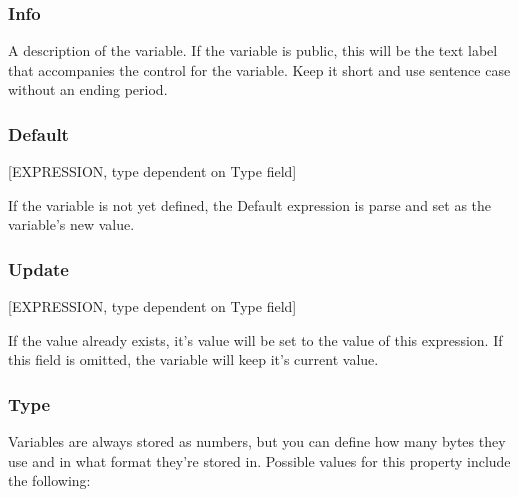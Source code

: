 \documentclass[12pt,a4paper,notitlepage]{article}
\begin{document}
\subsubsection{Info}
A description of the variable. If the variable is public, this will be the text label that accompanies the control for the variable. Keep it short and use sentence case without an ending period.

\subsubsection{Default}
[EXPRESSION, type dependent on Type field]

If the variable is not yet defined, the Default expression is parse and set as the variable's new value.

\subsubsection{Update}
[EXPRESSION, type dependent on Type field]

If the value already exists, it's value will be set to the value of this expression. If this field is omitted, the variable will keep it's current value.

\subsubsection{Type}
\label{subsubsec:create-var-type}
Variables are always stored as numbers, but you can define how many bytes they use and in what format they're stored in. Possible values for this property include the following:
\end{document}
